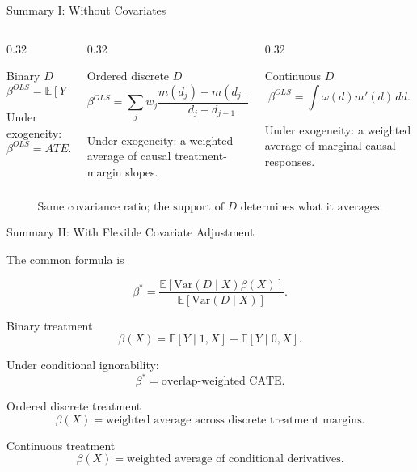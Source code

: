 \documentclass[aspectratio=169,11pt]{beamer}
\begin{document}
\begin{frame}{Summary I: Without Covariates}
\small

\begin{columns}[T]
\begin{column}{0.32\textwidth}
\begin{block}{Binary \(D\)}
\[
\beta^{OLS}
=
\mathbb{E}[Y\mid 1]
-
\mathbb{E}[Y\mid 0].
\]

\medskip
Under exogeneity:
\[
\boxed{\beta^{OLS}=ATE.}
\]
\end{block}
\end{column}

\begin{column}{0.32\textwidth}
\begin{block}{Ordered discrete \(D\)}
\[
\beta^{OLS}
=
\sum_j w_j
\frac{
m(d_j)-m(d_{j-1})
}{
d_j-d_{j-1}
}.
\]

Under exogeneity: a weighted average of
\alert{causal treatment-margin slopes}.
\end{block}
\end{column}

\begin{column}{0.32\textwidth}
\begin{block}{Continuous \(D\)}
\[
\beta^{OLS}
=
\int \omega(d)m'(d)\,dd.
\]

\medskip
Under exogeneity: a weighted average of
\alert{marginal causal responses}.
\end{block}
\end{column}
\end{columns}

\bigskip

\[
\boxed{
\text{Same covariance ratio; the support of } D
\text{ determines what it averages.}
}
\]

\end{frame}


\begin{frame}{Summary II: With Flexible Covariate Adjustment}
\small

The common formula is

\[
\boxed{
\beta^*
=
\frac{
\mathbb{E}
[
\mathrm{Var}(D\mid X)\beta(X)
]
}{
\mathbb{E}
[
\mathrm{Var}(D\mid X)
]
}.
}
\]

\begin{block}{Binary treatment}
\[
\beta(X)
=
\mathbb{E}[Y\mid 1,X]
-
\mathbb{E}[Y\mid 0,X].
\]

Under conditional ignorability:
\[
\boxed{
\beta^*
=
\text{overlap-weighted CATE}.
}
\]
\end{block}

\begin{block}{Ordered discrete treatment}
\[
\boxed{
\beta(X)
=
\text{weighted average across discrete treatment margins}.
}
\]
\end{block}

\begin{block}{Continuous treatment}
\[
\boxed{
\beta(X)
=
\text{weighted average of conditional derivatives}.
}
\]
\end{block}

\end{frame}
\end{document}
